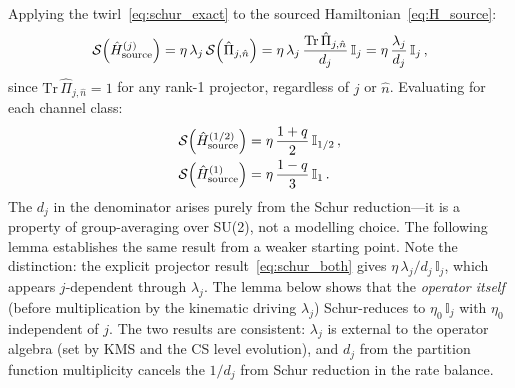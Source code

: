 \documentclass[aps,prd,twocolumn,10pt,superscriptaddress,nofootinbib]{revtex4-2}
\begin{document}
Applying the twirl~\eqref{eq:schur_exact} to the sourced
Hamiltonian~\eqref{eq:H_source}:
\begin{equation}
\mathcal{S}\!\left(\hat{H}_{\rm source}^{(j)}\right)
  = \eta\,\lambda_j\,
    \mathcal{S}\!\left(\hat{\Pi}_{j,\hat{n}}\right)
  = \eta\,\lambda_j\,
    \frac{\mathrm{Tr}\,\hat{\Pi}_{j,\hat{n}}}{d_j}\,\mathbb{I}_j
  = \eta\,\frac{\lambda_j}{d_j}\,\mathbb{I}_j\,,
\label{eq:schur_result}
\end{equation}
since $\mathrm{Tr}\,\hat{\Pi}_{j,\hat{n}} = 1$ for any rank-1
projector, regardless of $j$ or $\hat{n}$.  Evaluating for each
channel class:
\begin{align}
\mathcal{S}\!\left(\hat{H}_{\rm source}^{(1/2)}\right)
  &= \eta\,\frac{1+q}{2}\,\mathbb{I}_{1/2}\,,
\nonumber \\
\mathcal{S}\!\left(\hat{H}_{\rm source}^{(1)}\right)
  &= \eta\,\frac{1-q}{3}\,\mathbb{I}_1\,.
\label{eq:schur_both}
\end{align}
The $d_j$ in the denominator arises purely from the Schur
reduction---it is a property of group-averaging over SU(2), not a
modelling choice.  The following lemma establishes the same result
from a weaker starting point.  Note the distinction: the
explicit projector result~\eqref{eq:schur_both} gives
$\eta\,\lambda_j/d_j\,\mathbb{I}_j$, which appears
$j$-dependent through $\lambda_j$.  The lemma below shows that
the \emph{operator itself} (before multiplication by the
kinematic driving $\lambda_j$) Schur-reduces to
$\eta_0\,\mathbb{I}_j$ with $\eta_0$ independent of $j$.  The
two results are consistent: $\lambda_j$ is external to the
operator algebra (set by KMS and the CS level evolution), and
$d_j$ from the partition function multiplicity cancels the $1/d_j$
from Schur reduction in the rate balance.
\end{document}
